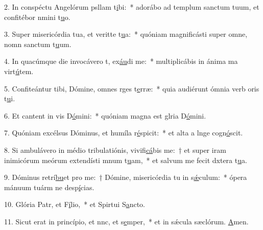 2. In conspéctu Angelórum psllam t\uline{i}bi:~* adorábo ad templum sanctum tuum, et confitébor nmini t\uline{u}o.\par 
3. Super misericórdia tua, et veritte t\uline{u}a:~* quóniam magnificásti super omne, nomn sanctum t\uline{u}um.\par 
4. In quacúmque die invocávero t, ex\uline{áu}di me:~* multiplicábis in ánima ma virt\uline{ú}tem.\par 
5. Confiteántur tibi, Dómine, omnes rges t\uline{e}rræ:~* quia audiérunt ómnia verb oris t\uline{u}i.\par 
6. Et cantent in vis D\uline{ó}mini:~* quóniam magna est glria D\uline{ó}mini.\par 
7. Quóniam excélsus Dóminus, et humíla r\uline{é}spicit:~* et alta a lnge cogn\uline{ó}scit.\par 
8. Si ambulávero in médio tribulatiónis, vivifi\uline{cá}bis me:~† et super iram inimicórum meórum extendísti mnum t\uline{u}am,~* et salvum me fecit dxtera t\uline{u}a.\par 
9. Dóminus retrí\uline{bu}et pro me:~† Dómine, misericórdia tu in s\uline{ǽ}culum:~* ópera mánuum tuárm ne desp\uline{í}cias.\par 
10. Glória Patr, et F\uline{í}lio,~* et Spirtui S\uline{a}ncto.\par 
11. Sicut erat in princípio, et nnc, et s\uline{e}mper,~* et in sǽcula sæclórum. \uline{A}men.\par 
